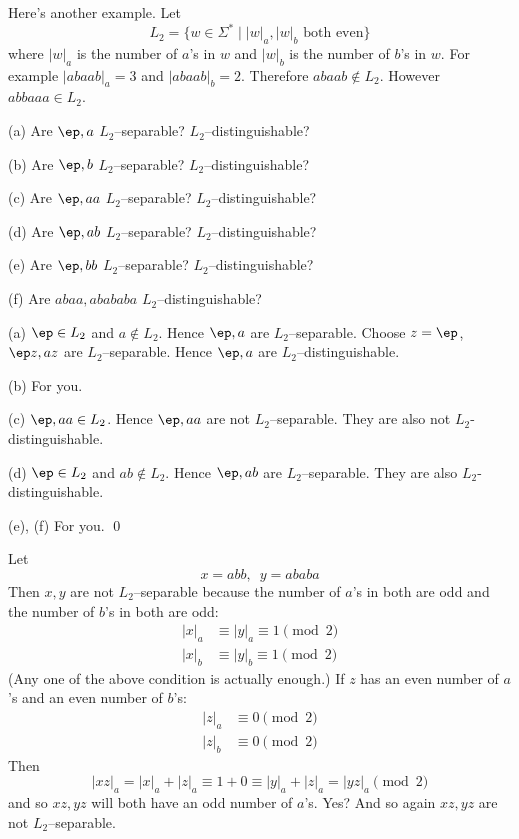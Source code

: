\newpage
\begin{eg}
Here's another example.
Let
\[
L_2 = \{w \in \Sigma^* \mid |w|_a, |w|_b \text{ both even}\}
\]
where
$|w|_a$ is the number of $a$'s in $w$
and
$|w|_b$ is the number of $b$'s in $w$.
For example $|abaab|_a = 3$ and $|abaab|_b = 2$.
Therefore $abaab \not\in L_2$.
However $abbaaa \in L_2$.
\begin{tightlist}
  \item[\textnormal{(a)}] Are $\ep, a$ $L_2$--separable? $L_2$--distinguishable?
  \item[\textnormal{(b)}] Are $\ep, b$ $L_2$--separable? $L_2$--distinguishable?
  \item[\textnormal{(c)}] Are $\ep, aa$ $L_2$--separable? $L_2$--distinguishable?
  \item[\textnormal{(d)}] Are $\ep, ab$ $L_2$--separable? $L_2$--distinguishable?
  \item[\textnormal{(e)}] Are $\ep, bb$ $L_2$--separable? $L_2$--distinguishable?
  \item[\textnormal{(f)}] Are $abaa, abababa$ $L_2$--distinguishable?
\end{tightlist}
\end{eg}

\SOLUTION
(a) $\ep \in L_2$ and $a \not\in L_2$.
Hence $\ep, a$ are $L_2$--separable.
Choose $z = \ep$, $\ep z, a z$ are $L_2$--separable.
Hence $\ep, a$ are $L_2$--distinguishable.

(b) For you.

(c) $\ep, aa \in L_2$.
Hence $\ep, aa$ are not $L_2$--separable.
They are also not $L_2$-distinguishable.

(d) $\ep \in L_2$ and $ab \not\in L_2$.
Hence $\ep, ab$ are $L_2$--separable.
They are also $L_2$-distinguishable.

(e), (f) For you.
\qed

Let
\[
x = abb, \,\,\, y = ababa
\]
Then $x,y$ are not $L_2$--separable because
the number of $a$'s in both are odd
and the number of $b$'s in both are odd:
\begin{align*}
|x|_a &\equiv |y|_a \equiv 1 \pmod{2} \\
|x|_b &\equiv |y|_b \equiv 1 \pmod{2}
\end{align*}
(Any one of the above condition is actually enough.)
If $z$ has an even number of $a$'s
and an even number of $b$'s:
\begin{align*}
  |z|_a &\equiv 0 \pmod{2} \\
  |z|_b &\equiv 0 \pmod{2}
\end{align*}
Then
\[
|xz|_a = |x|_a + |z|_a \equiv 1 + 0 \equiv |y|_a + |z|_a = |yz|_a \pmod{2}
\]
and so $xz, yz$ will both have an odd number of $a$'s. Yes?
And so again $xz,yz$ are not $L_2$--separable.

